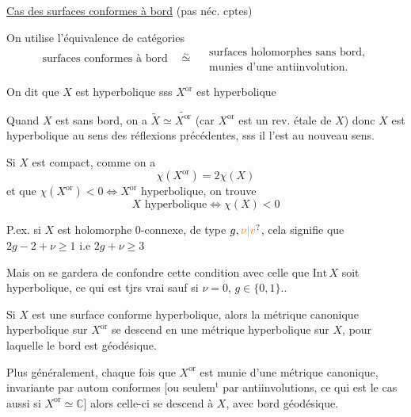 \uline{Cas des surfaces conformes à bord} (pas néc. cptes)

On utilise l'équivalence de catégories
\[
\text{surfaces conformes à bord}\quad\overset{\sim}{\simeq}\quad
\begin{gathered}\text{surfaces holomorphes sans bord,}\\
\text{munies d'une antiinvolution.}\end{gathered}
\]

On dit que $X$ est hyperbolique sss $X^{\mathrm{or}}$ est hyperbolique 

Quand $X$ est sans bord, on a $\widetilde X\simeq\widetilde{X^{\mathrm{or}}}$ (car $X^{\mathrm{or}}$ est un rev. étale de $X$) donc $X$ est hyperbolique au sens des réflexions précédentes, sss il l'est au nouveau sens.

Si $X$ est compact,  comme on a
\[
\chi(X^{\mathrm{or}})=2\chi(X)
\]
et que $\chi(X^{\mathrm{or}})<0\Longleftrightarrow X^{\mathrm{or}}\text{ hyperbolique}$, on trouve
\[
X\text{ hyperbolique}\Longleftrightarrow\chi(X)<0
\]

P.ex. si $X$ est holomorphe 0-connexe, de type $g,\unsure{\nu|v}$, cela signifie que $2g-2+\nu\geq1$ i.e $2g+\nu\geq3$

Mais on se gardera de confondre cette condition avec celle que $\mathrm{Int}\,X$ soit hyperbolique, ce qui est tjrs vrai sauf si $\nu=0$, $g\in\{0,1\}$..

Si $X$ est une surface conforme hyperbolique, alors la métrique canonique hyperbolique sur $X^{\mathrm{or}}$ se descend en une métrique hyperbolique sur $X$, pour laquelle le bord est géodésique.

Plus généralement, chaque fois que $X^{\mathrm{or}}$ est munie d'une métrique canonique, invariante par autom conformes [ou seulem$^{\mathrm t}$ par antiinvolutions, ce qui est le cas aussi si $X^{\mathrm{or}}\simeq\mathbb C$] alors celle-ci se descend à $X$, avec bord géodésique.

